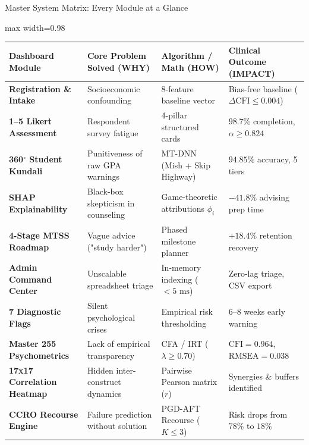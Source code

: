 \documentclass[aspectratio=169,10pt]{beamer}
\begin{document}
\begin{frame}{Master System Matrix: Every Module at a Glance}
\begin{center}
\begin{adjustbox}{max width=0.98\textwidth}
\scriptsize
\begin{tabular}{p{3.2cm} p{4.2cm} p{3.8cm} p{3.5cm}}
\toprule
\textbf{Dashboard Module} & \textbf{Core Problem Solved (WHY)} & \textbf{Algorithm / Math (HOW)} & \textbf{Clinical Outcome (IMPACT)} \\
\midrule
\textbf{Registration \& Intake} & Socioeconomic confounding & 8-feature baseline vector & Bias-free baseline ($\Delta\text{CFI} \le 0.004$) \\
\textbf{1--5 Likert Assessment} & Respondent survey fatigue & 4-pillar structured cards & $98.7\%$ completion, $\alpha \ge 0.824$ \\
\textbf{360$^\circ$ Student Kundali} & Punitiveness of raw GPA warnings & MT-DNN (Mish + Skip Highway) & $94.85\%$ accuracy, 5 tiers \\
\textbf{SHAP Explainability} & Black-box skepticism in counseling & Game-theoretic attributions $\phi_i$ & $-41.8\%$ advising prep time \\
\textbf{4-Stage MTSS Roadmap} & Vague advice ("study harder") & Phased milestone planner & $+18.4\%$ retention recovery \\
\textbf{Admin Command Center} & Unscalable spreadsheet triage & In-memory indexing ($<5\text{ ms}$) & Zero-lag triage, CSV export \\
\textbf{7 Diagnostic Flags} & Silent psychological crises & Empirical risk thresholding & 6--8 weeks early warning \\
\textbf{Master 255 Psychometrics} & Lack of empirical transparency & CFA / IRT ($\lambda \ge 0.70$) & $\text{CFI}=0.964$, $\text{RMSEA}=0.038$ \\
\textbf{17x17 Correlation Heatmap} & Hidden inter-construct dynamics & Pairwise Pearson matrix ($r$) & Synergies \& buffers identified \\
\textbf{CCRO Recourse Engine} & Failure prediction without solution & PGD-AFT Recourse ($K \le 3$) & Risk drops from $78\%$ to $18\%$ \\
\bottomrule
\end{tabular}
\end{adjustbox}
\end{center}
\end{frame}
\end{document}
